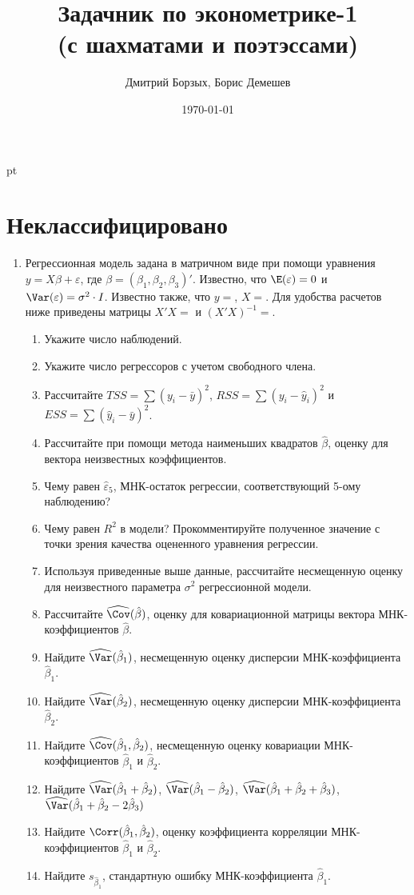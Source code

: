 \documentclass[pdftex,12pt,a4paper]{article}
\title{Задачник по эконометрике-1 \\ {\small (с шахматами и поэтэссами)}}
\author{Дмитрий Борзых, Борис Демешев}
\date{\today}
\def \hb{\hat{\beta}}
\def \he{\hat{\varepsilon}}
\begin{document}
\maketitle %


 pt %

\section{Неклассифицировано}

\begin{enumerate}
\item Регрессионная модель   задана в матричном виде при помощи уравнения $y=X\beta+\varepsilon$, где $\beta=(\beta_1,\beta_2,\beta_3)'$.
Известно, что $\E(\varepsilon)=0$  и  $\Var(\varepsilon)=\sigma^2\cdot I$.
Известно также, что $y=$, $X=$.
Для удобства расчетов ниже приведены матрицы 
 $X'X=$ и $(X'X)^{-1}=$.

\begin{enumerate}
\item Укажите число наблюдений.
\item Укажите число регрессоров с учетом свободного члена.
\item Рассчитайте $TSS=\sum (y_i-\bar{y})^2$, $RSS=\sum (y_i-\hat{y}_i)^2$ и $ESS=\sum (\hat{y}_i-\bar{y})^2$.
\item Рассчитайте при помощи метода наименьших квадратов $\hb$, оценку для вектора неизвестных коэффициентов.
\item Чему равен $\he_5$, МНК-остаток регрессии, соответствующий 5-ому наблюдению?
\item Чему равен $R^2$  в модели? Прокомментируйте полученное значение с точки зрения качества оцененного уравнения регрессии.
\item Используя приведенные выше данные, рассчитайте несмещенную оценку для неизвестного параметра $\sigma^2$ регрессионной модели.
\item Рассчитайте $\widehat{\Cov}(\hb)$, оценку для ковариационной матрицы вектора МНК-коэффициентов $\hb$.  
\item Найдите $\widehat{\Var}(\hb_1)$, несмещенную оценку дисперсии МНК-коэффициента $\hb_1$.
\item Найдите $\widehat{\Var}(\hb_2)$, несмещенную оценку дисперсии МНК-коэффициента $\hb_2$.
\item Найдите $\widehat{\Cov}(\hb_1,\hb_2)$, несмещенную оценку ковариации МНК-коэффициентов $\hb_1$ и $\hb_2$.
\item Найдите $\widehat{\Var}(\hb_1+\hb_2)$, $\widehat{\Var}(\hb_1-\hb_2)$, $\widehat{\Var}(\hb_1+\hb_2+\hb_3)$, $\widehat{\Var}(\hb_1+\hb_2-2\hb_3)$
\item Найдите $\Corr(\hb_1,\hb_2)$, оценку коэффициента корреляции МНК-коэффициентов $\hb_1$ и $\hb_2$.
\item Найдите $s_{\hb_1}$, стандартную ошибку МНК-коэффициента $\hb_1$.
\end{enumerate}


\end{enumerate}
\end{document}

